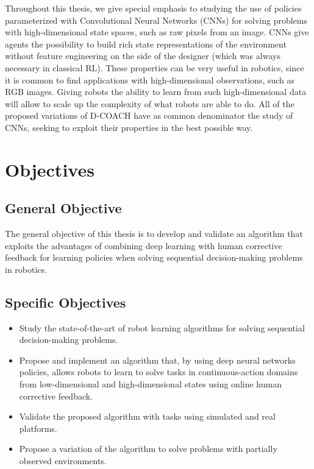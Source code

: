 \begin{intro}
Throughout this thesis, we give special emphasis to studying the use of policies parameterized with Convolutional Neural Networks (CNNs) for solving problems with high-dimensional state spaces, such as raw pixels from an image. CNNs give agents the possibility to build rich state representations of the environment without feature engineering on the side of the designer (which was always necessary in classical RL). These properties can be very useful in robotics, since it is common to find applications with high-dimensional observations, such as RGB images. Giving robots the ability to learn from such high-dimensional data will allow to scale up the complexity of what robots are able to do. All of the proposed variations of D-COACH have as common denominator the study of CNNs,  seeking to exploit their properties in the best possible way. 

\section{Objectives}
\subsection{General Objective}
The general objective of this thesis is to develop and validate an algorithm that exploits the advantages of combining deep learning with human corrective feedback for learning policies when solving sequential decision-making problems in robotics. 

\subsection{Specific Objectives}

\begin{itemize}
    \item Study the state-of-the-art of robot learning algorithms for solving sequential decision-making problems.
    \item Propose and implement an algorithm that, by using deep neural networks policies, allows robots to learn to solve tasks in continuous-action domains from low-dimensional and high-dimensional states using online human corrective feedback. 
    \item Validate the proposed algorithm with tasks using simulated and real platforms.
    \item Propose a variation of the algorithm to solve problems with partially observed environments.
\end{itemize}


\end{intro}
